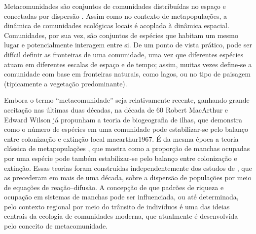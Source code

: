 \documentclass[12pt]{extarticle}
\begin{document}
Metacomunidades são conjuntos de comunidades distribuídas no espaço e
conectadas por dispersão \citep{hanski1991, holyoak2005}. Assim como no
contexto de metapopulações, a dinâmica de comunidades ecológicas locais é
acoplada à dinâmica espacial.  Comunidades, por sua vez, são conjuntos de
espécies que habitam um mesmo lugar e potencialmente interagem entre si. De um
ponto de vista prático, pode ser difícil definir as fronteiras de uma
comunidade, uma vez que diferentes espécies atuam em diferentes escalas de
espaço e de tempo; assim, muitas vezes define-se a comunidade com base em
fronteiras naturais, como lagos, ou no tipo de paisagem (tipicamente a
vegetação predominante).

Embora o termo ``metacomunidade'' seja relativamente recente, ganhando grande
aceitação nas últimas duas décadas, na década de 60 Robert MacArthur e Edward Wilson
já propunham a
teoria de biogeografia de ilhas, que demonstra como o número de espécies em uma comunidade pode estabilizar-se
pelo balanço entre colonização e extinção local {macarthur1967}. 
É da mesma época a teoria clássica de metapopulações \citep{levins1969,levins1971}, 
que mostra como a proporção de manchas ocupadas por uma espécie pode também estabilizar-se pelo 
balanço entre colonização e extinção. Essas teorias foram construídas
independentemente dos estudos de \citet{skellam1951}, que as precederam em
mais de uma década, sobre a dispersão de populações por meio de equações de
reação--difusão.
A concepção de que padrões de riqueza e ocupação em sistemas de manchas pode ser influenciada, ou até
determinada, pelo contexto regional por meio do trânsito de indivíduos 
é uma das ideias centrais da ecologia de
comunidades moderna, que atualmente é desenvolvida pelo conceito de
metacomunidade.
\end{document}
